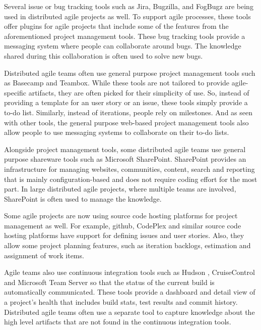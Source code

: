 Several issue or bug tracking tools such as Jira\cite{jira}, Bugzilla\cite{bugzilla}, and FogBugz\cite{fog_bugz} are being used in distributed agile projects as well. To support agile processes, these tools offer plugins for agile projects that include some of the features from the aforementioned project management tools. These bug tracking tools provide a messaging system where people can collaborate around bugs. The knowledge shared during this collaboration is often used to solve new bugs\cite{issue_tracking}.

Distributed agile teams often use general purpose project management tools such as Basecamp\cite{basecamp} and Teambox\cite{team_box}. While these tools are not tailored to provide agile-specific artifacts, they are often picked for their simplicity of use. So, instead of providing a template for an user story or an issue, these tools simply provide a to-do list. Similarly, instead of iterations, people rely on milestones. And as seen with other tools, the general purpose web-based project management tools also allow people to use messaging systems to collaborate on their to-do lists.

Alongside project management tools, some distributed agile teams use general purpose shareware tools such as Microsoft SharePoint\cite{share_point}. SharePoint provides an infrastructure for managing websites, communities, content, search and reporting that is mainly configuration-based and does not require coding effort for the most part. In large distributed agile projects, where multiple teams are involved, SharePoint is often used to manage the knowledge.

Some agile projects are now using source code hosting platforms for project management as well. For example, github\cite{github}, CodePlex\cite{codeplex} and similar source code hosting platforms have support for defining issues and user stories. Also, they allow some project planning features, such as iteration backlogs, estimation and assignment of work items.

Agile teams also use continuous integration tools such as Hudson \cite{Hudson}, CruiseControl\cite{cruise_control} and Microsoft Team Server\cite{team_server} so that the status of the current build is automatically communicated. These tools provide a dashboard and detail view of a project's health that includes build stats, test results and commit history. Distributed agile teams often use a separate tool to capture knowledge about the high level artifacts that are not found in the continuous integration tools.

